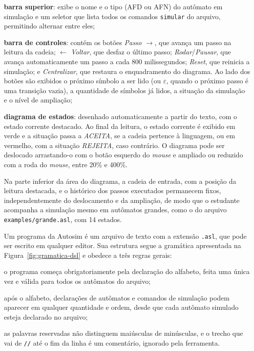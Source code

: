 \documentclass[
    12pt
    ,oneside
    ,a4paper
    ,chapter=TITLE
    ,section=TITLE
    ,sumario=abnt-6027-2012]{abntex2}
\begin{document}
\begin{alineas}
    \item \textbf{barra superior}: exibe o nome e o tipo (AFD ou AFN) do autômato em
    simulação e um seletor que lista todos os comandos \texttt{simular} do arquivo,
    permitindo alternar entre eles;
    \item \textbf{barra de controles}: contém os botões \textit{Passo $\rightarrow$}, que avança um
    passo na leitura da cadeia; \textit{$\leftarrow$ Voltar}, que desfaz o último passo;
    \textit{Rodar}/\textit{Pausar}, que avança automaticamente um passo a cada 800
    milissegundos; \textit{Reset}, que reinicia a simulação; e \textit{Centralizar},
    que restaura o enquadramento do diagrama. Ao lado dos botões são exibidos o próximo
    símbolo a ser lido (ou $\varepsilon$, quando o próximo passo é uma transição vazia), a
    quantidade de símbolos já lidos, a situação da simulação e o nível de ampliação;
    \item \textbf{diagrama de estados}: desenhado automaticamente a partir do texto, com o
    estado corrente destacado. Ao final da leitura, o estado corrente é exibido em verde
    e a situação passa a \textit{ACEITA}, se a cadeia pertence à linguagem, ou em
    vermelho, com a situação \textit{REJEITA}, caso contrário. O diagrama pode ser
    deslocado arrastando-o com o botão esquerdo do \textit{mouse} e ampliado ou reduzido
    com a roda do \textit{mouse}, entre 20\% e 400\%.
\end{alineas}

Na parte inferior da área do diagrama, a cadeia de entrada, com a posição da leitura
destacada, e o histórico dos passos executados permanecem fixos, independentemente do
deslocamento e da ampliação, de modo que o estudante acompanha a
simulação mesmo em autômatos grandes, como o do arquivo
\texttt{examples/grande.asl}, com 14 estados.


Um programa da Autosim é um arquivo de texto com a extensão \texttt{.asl}, que pode ser
escrito em qualquer editor. Sua estrutura segue a gramática apresentada na
Figura~\ref{fig:gramatica-dsl} e obedece a três regras gerais:

\begin{alineas}
    \item o programa começa obrigatoriamente pela declaração do alfabeto, feita uma única
    vez e válida para todos os autômatos do arquivo;
    \item após o alfabeto, declarações de autômatos e comandos de simulação podem aparecer
    em qualquer quantidade e ordem, desde que cada autômato simulado esteja declarado no
    arquivo;
    \item as palavras reservadas não distinguem maiúsculas de minúsculas, e o trecho que
    vai de \texttt{//} até o fim da linha é um comentário, ignorado pela ferramenta.
\end{alineas}
\end{document}
